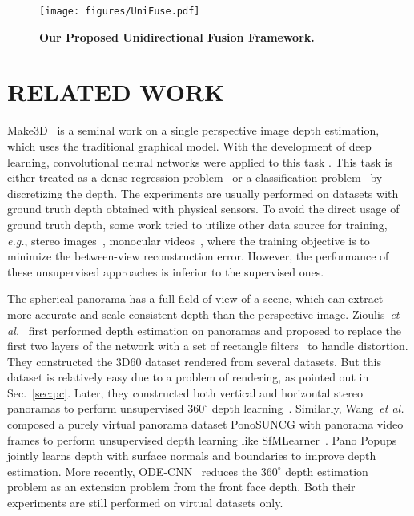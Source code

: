 \documentclass[letterpaper, 10 pt, conference]{ieeeconf}
\def\eg{\emph{e.g.}}
\def\etal{\emph{et al.}}
\begin{document}
\begin{figure*}[t]
\vspace{6pt}
\begin{center}
\texttt{[image: figures/UniFuse.pdf]}
\end{center}
\caption{\textbf{Our Proposed Unidirectional Fusion Framework.} }
\label{fig:framework}
\end{figure*}


\section{RELATED WORK}
\label{sec:rw}

Make3D~\cite{saxena2009make3d} is a seminal work on a single perspective image depth estimation, which uses the traditional graphical model.  
With the development of deep learning, convolutional neural networks were applied to this task \cite{eigen2014depth, liu2015learning, laina2016deeper, jiang2019high, fu2018deep, li2018monocular, jiang2019hierarchical}. This task is either treated as a dense regression problem~\cite{eigen2014depth, liu2015learning, laina2016deeper, jiang2019high} or a classification problem~\cite{fu2018deep, li2018monocular, jiang2019hierarchical} by discretizing the depth. The experiments are usually performed on datasets with ground truth depth obtained with physical sensors. 
To avoid the direct usage of ground truth depth, some work tried to utilize other data source for training, \eg, stereo images~\cite{garg2016unsupervised, godard2017unsupervised, godard2019digging}, monocular videos~\cite{zhou2017unsupervised, wang2019unsupervised, godard2019digging, jiang2020dipe}, where the training objective is to minimize the between-view reconstruction error. However, the performance of these unsupervised approaches is inferior to the supervised ones. 


The spherical panorama has a full field-of-view of a scene, which can extract more accurate and scale-consistent depth than the perspective image. Zioulis~\etal~\cite{zioulis2018omnidepth} first performed depth estimation on panoramas and proposed to replace the first two layers of the network with a set of rectangle filters~\cite{su2017learning} to handle distortion.
They constructed the 3D60 dataset rendered from several datasets. But this dataset is relatively easy due to a problem of rendering, as pointed out in Sec.~\ref{sec:pc}. 
Later, they constructed both vertical and horizontal stereo panoramas to perform unsupervised $360^{\circ}$ depth learning~\cite{zioulis2019spherical}. Similarly, Wang~\etal~\cite{wang2018self} composed a purely virtual panorama dataset PonoSUNCG with panorama video frames to perform unsupervised depth learning like SfMLearner~\cite{zhou2017unsupervised}. 
Pano Popups~\cite{eder2019pano} jointly learns depth with surface normals and boundaries to improve depth estimation. More recently, ODE-CNN~\cite{cheng2020ode} reduces the $360^{\circ}$ depth estimation problem as an extension problem from the front face depth. Both their experiments are still performed on virtual datasets only. 
\end{document}
